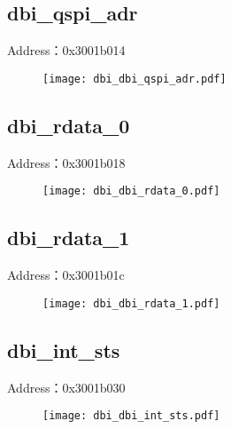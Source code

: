 \subsection{dbi\_qspi\_adr}
\label{dbi-dbi-qspi-adr}
Address：0x3001b014
 \begin{figure}[H]
\texttt{[image: dbi\_dbi\_qspi\_adr.pdf]}
\end{figure}

\subsection{dbi\_rdata\_0}
\label{dbi-dbi-rdata-0}
Address：0x3001b018
 \begin{figure}[H]
\texttt{[image: dbi\_dbi\_rdata\_0.pdf]}
\end{figure}

\subsection{dbi\_rdata\_1}
\label{dbi-dbi-rdata-1}
Address：0x3001b01c
 \begin{figure}[H]
\texttt{[image: dbi\_dbi\_rdata\_1.pdf]}
\end{figure}

\subsection{dbi\_int\_sts}
\label{dbi-dbi-int-sts}
Address：0x3001b030
 \begin{figure}[H]
\texttt{[image: dbi\_dbi\_int\_sts.pdf]}
\end{figure}

